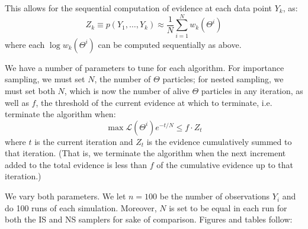 \documentclass[psamsfonts]{amsart}
\begin{document}
This allows for the sequential computation of evidence at each data point $Y_k$, as:
$$Z_k \equiv p(Y_1, \dots, Y_k) \approx \frac{1}{N} \sum_{i=1}^N w_k (\Theta^i)$$
where each $\log w_k(\Theta^i)$ can be computed sequentially as above.

We have a number of parameters to tune for each algorithm. For importance sampling, we must set $N$, the number of $\Theta$ particles; for nested sampling, we must set both $N$, which is now the number of alive $\Theta$ particles in any iteration, as well as $f$, the threshold of the current evidence at which to terminate, i.e. terminate the algorithm when:
$$\max \mathcal{L}(\Theta^i) e^{-t/N} \leq f\cdot Z_t$$
where $t$ is the current iteration and $Z_t$ is the evidence cumulatively summed to that iteration. (That is, we terminate the algorithm when the next increment added to the total evidence is less than $f$ of the cumulative evidence up to that iteration.)

We vary both parameters. We let $n = 100$ be the number of observations $Y_i$ and do 100 runs of each simulation. Moreover, $N$ is set to be equal in each run for both the IS and NS samplers for sake of comparison. Figures and tables follow:\\

\end{document}
